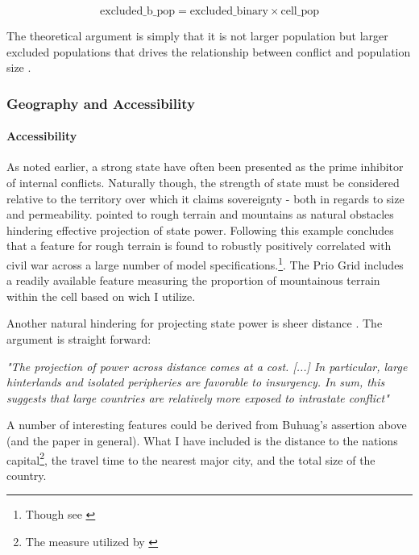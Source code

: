 \documentclass[a4paper]{article}
\begin{document}
$$ \textrm{excluded\_b\_pop}  = \textrm{excluded\_binary} \times \textrm{cell\_pop}  $$

The theoretical argument is simply that it is not larger population but larger excluded populations that drives the relationship between conflict and population size \citep[69-74]{Cederman_Gleditsch_Buhaug_2013}.

\subsubsection{Geography and Accessibility} %

\paragraph{Accessibility} As noted earlier, a strong state have often been presented as the prime inhibitor of internal conflicts. Naturally though, the strength of state must be considered relative to the territory over which it claims sovereignty - both in regards to size and permeability. \cite{Fearon_Laitin_2003} pointed to rough terrain and mountains as natural obstacles hindering effective projection of state power. Following this example \cite{Hegre_Sambanis_2006} concludes that a feature for rough terrain is found to robustly positively correlated with civil war across a large number of model specifications.\cite[526-529]{Hegre_Sambanis_2006}\footnote{Though see \cite{Goldstone_2010}}. The Prio Grid includes a readily available feature measuring the proportion of mountainous terrain within the cell based on \cite{Blyth_2002} wich I utilize.\par

Another natural hindering for projecting state power is sheer distance \citep{Fearon_2004, Buhaug_Gates_Lujala_2009, Cederman_Buhaug_Roed_2009, Buhaug_2010}. The argument is straight forward:

\begin{displayquote}

\emph{"The projection of power across distance comes at a cost. [...] In particular, large hinterlands and isolated peripheries are favorable to insurgency. In sum, this suggests that large countries are relatively more exposed to intrastate conflict"}\cite[113-114]{Buhaug_2010}

\end{displayquote}

A number of interesting features could be derived from Buhuag's assertion above (and the paper in general). What I have included is the distance to the nations capital\footnote{The measure utilized by \cite{Buhaug_2010}}, the travel time to the nearest major city, and the total size of the country\cite{prio_code_2015}.
\end{document}
